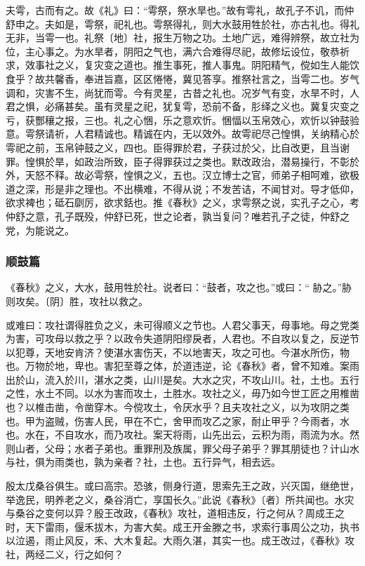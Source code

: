 \documentclass[]{article}
\begin{document}
夫雩，古而有之。故《礼》曰：``雩祭，祭水旱也。''故有雩礼，故孔子不讥，而仲舒申之。夫如是，雩祭，祀礼也。雩祭得礼，则大水鼓用牲於社，亦古礼也。得礼无非，当雩一也。礼祭〔地〕社，报生万物之功。土地广远，难得辨祭，故立社为位，主心事之。为水旱者，阴阳之气也，满六合难得尽祀，故修坛设位，敬恭祈求，效事社之义，复灾变之道也。推生事死，推人事鬼。阴阳精气，傥如生人能饮食乎？故共馨香，奉进旨嘉，区区惓惓，冀见答享。推祭社言之，当雩二也。岁气调和，灾害不生，尚犹而雩。今有灵星，古昔之礼也。况岁气有变，水旱不时，人君之惧，必痛甚矣。虽有灵星之祀，犹复雩，恐前不备，肜绎之义也。冀复灾变之亏，获酆穰之报，三也。礼之心悃，乐之意欢忻。悃愊以玉帛效心，欢忻以钟鼓验意。雩祭请祈，人君精诚也。精诚在内，无以效外。故雩祀尽己惶惧，关纳精心於雩祀之前，玉帛钟鼓之义，四也。臣得罪於君，子获过於父，比自改更，且当谢罪。惶惧於旱，如政治所致，臣子得罪获过之类也。默改政治，潜易操行，不彰於外，天怒不释。故必雩祭，惶惧之义，五也。汉立博士之官，师弟子相呵难，欲极道之深，形是非之理也。不出横难，不得从说；不发苦诘，不闻甘对。导才低仰，欲求裨也；砥石劘厉，欲求銛也。推《春秋》之义，求雩祭之说，实孔子之心，考仲舒之意，孔子既殁，仲舒已死，世之论者，孰当复问？唯若孔子之徒，仲舒之党，为能说之。

\hypertarget{header-n650}{%
\subsubsection{顺鼓篇}\label{header-n650}}

《春秋》之义，大水，鼓用牲於社。说者曰：``鼓者，攻之也。''或曰：``
胁之。''胁则攻矣。〔阴〕胜，攻社以救之。

或难曰：攻社谓得胜负之义，未可得顺义之节也。人君父事天，母事地。母之党类为害，可攻母以救之乎？以政令失道阴阳缪戾者，人君也。不自攻以复之，反逆节以犯尊，天地安肯济？使湛水害伤天，不以地害天，攻之可也。今湛水所伤，物也。万物於地，卑也。害犯至尊之体，於道违逆，论《春秋》者，曾不知难。案雨出於山，流入於川，湛水之类，山川是矣。大水之灾，不攻山川。社，土也。五行之性，水土不同。以水为害而攻土，土胜水。攻社之义，毋乃如今世工匠之用椎凿也？以椎击凿，令凿穿木。今傥攻土，令厌水乎？且夫攻社之义，以为攻阴之类也。甲为盗贼，伤害人民，甲在不亡，舍甲而攻乙之家，耐止甲乎？今雨者，水也。水在，不自攻水，而乃攻社。案天将雨，山先出云，云积为雨，雨流为水。然则山者，父母；水者子弟也。重罪刑及族属，罪父母子弟乎？罪其朋徒也？计山水与社，俱为雨类也，孰为亲者？社，土也。五行异气，相去远。

殷太戊桑谷俱生。或曰高宗。恐骇，侧身行道，思索先王之政，兴灭国，继绝世，举逸民，明养老之义，桑谷消亡，享国长久。''此说《春秋》〔者〕所共闻也。水灾与桑谷之变何以异？殷王改政，《春秋》攻社，道相违反，行之何从？周成王之时，天下雷雨，偃禾拔木，为害大矣。成王开金滕之书，求索行事周公之功，执书以泣遏，雨止风反，禾、大木复起。大雨久湛，其实一也。成王改过，《春秋》攻社，两经二义，行之如何？
\end{document}
